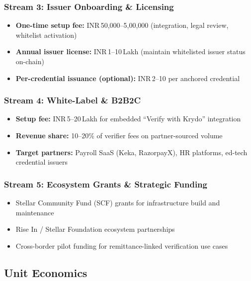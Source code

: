 \documentclass[11pt,a4paper]{article}
\newcommand{\krydo}{\textsf{Krydo}}
\newcommand{\stellar}{\textsf{Stellar}}
\begin{document}
\subsubsection{Stream 3: Issuer Onboarding \& Licensing}

\begin{itemize}
  \item \textbf{One-time setup fee:} INR\,50,000--5,00,000 (integration, legal review, whitelist activation)
  \item \textbf{Annual issuer license:} INR\,1--10\,Lakh (maintain whitelisted issuer status on-chain)
  \item \textbf{Per-credential issuance (optional):} INR\,2--10 per anchored credential
\end{itemize}

\subsubsection{Stream 4: White-Label \& B2B2C}

\begin{itemize}
  \item \textbf{Setup fee:} INR\,5--20\,Lakh for embedded ``Verify with \krydo{}'' integration
  \item \textbf{Revenue share:} 10--20\% of verifier fees on partner-sourced volume
  \item \textbf{Target partners:} Payroll SaaS (Keka, RazorpayX), HR platforms, ed-tech credential issuers
\end{itemize}

\subsubsection{Stream 5: Ecosystem Grants \& Strategic Funding}

\begin{itemize}
  \item \stellar{} Community Fund (SCF) grants for infrastructure build and maintenance
  \item Rise In / \stellar{} Foundation ecosystem partnerships
  \item Cross-border pilot funding for remittance-linked verification use cases
\end{itemize}

\subsection{Unit Economics}
\end{document}

